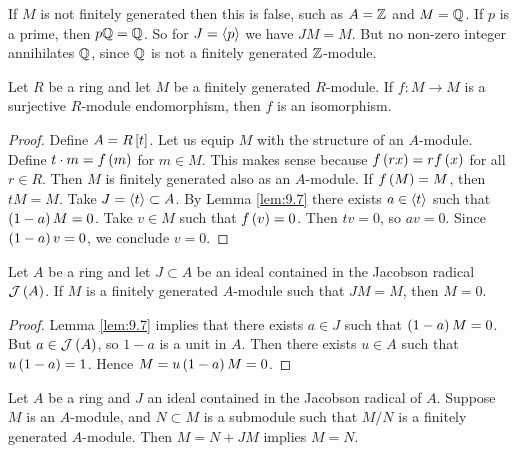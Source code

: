 
\begin{remark*}
If $ M $ is not finitely generated then this is false, such as $ A = \mathbb{Z} $ and $ M = \mathbb{Q} $. If $ p $ is a prime, then $ p\mathbb{Q} = \mathbb{Q} $. So for $ J = \left\langle p \right\rangle $ we have $ JM = M $. But no non-zero integer annihilates $ \mathbb{Q} $, since $ \mathbb{Q} $ is not a finitely generated $ \mathbb{Z} $-module.
\end{remark*}

\begin{corollary}
Let $ R $ be a ring and let $ M $ be a finitely generated $ R $-module. If $ f : M \to M $ is a surjective $ R $-module endomorphism, then $ f $ is an isomorphism.
\end{corollary}

\begin{proof}
Define $ A = R\sbr{t} $. Let us equip $ M $ with the structure of an $ A $-module. Define $ t \cdot m = f\br{m} $ for $ m \in M $. This makes sense because $ f\br{rx} = rf\br{x} $ for all $ r \in R $. Then $ M $ is finitely generated also as an $ A $-module. If $ f\br{M} = M $, then $ tM = M $. Take $ J = \left\langle t \right\rangle \subset A $. By Lemma \ref{lem:9.7} there exists $ a \in \left\langle t \right\rangle $ such that $ \br{1 - a}M = 0 $. Take $ v \in M $ such that $ f\br{v} = 0 $. Then $ tv = 0 $, so $ av = 0 $. Since $ \br{1 - a}v = 0 $, we conclude $ v = 0 $.
\end{proof}

\begin{theorem}
Let $ A $ be a ring and let $ J \subset A $ be an ideal contained in the Jacobson radical $ \JJJ\br{A} $. If $ M $ is a finitely generated $ A $-module such that $ JM = M $, then $ M = 0 $.
\end{theorem}

\begin{proof}
Lemma \ref{lem:9.7} implies that there exists $ a \in J $ such that $ \br{1 - a}M = 0 $. But $ a \in \JJJ\br{A} $, so $ 1 - a $ is a unit in $ A $. Then there exists $ u \in A $ such that $ u\br{1 - a} = 1 $. Hence $ M = u\br{1 - a}M = 0 $.
\end{proof}

\begin{corollary}
\label{cor:9.10}
Let $ A $ be a ring and $ J $ an ideal contained in the Jacobson radical of $ A $. Suppose $ M $ is an $ A $-module, and $ N \subset M $ is a submodule such that $ M / N $ is a finitely generated $ A $-module. Then $ M = N + JM $ implies $ M = N $.
\end{corollary}

